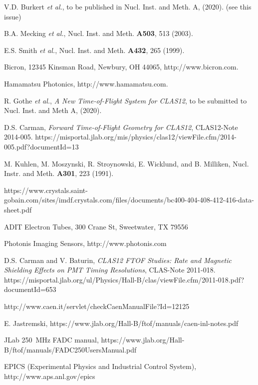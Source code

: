 \documentclass{elsart}
\begin{document}
\begin{thebibliography}{99}

V.D. Burkert {\it et al.}, to be published in Nucl. Inst. and Meth. A, (2020). (see this issue)
  
B.A. Mecking {\it et al.}, Nucl. Inst. and Meth. {\bf A503}, 513 (2003).

E.S. Smith {\it et al.}, Nucl. Inst. and Meth. {\bf A432}, 265 (1999).

Bicron, 12345 Kinsman Road, Newbury, OH 44065, http://www.bicron.com.

Hamamatsu Photonics, http://www.hamamatsu.com.
  
R. Gothe {\it et al.}, {\it A New Time-of-Flight System for CLAS12}, to be submitted to Nucl. Inst.
and Meth A, (2020).

D.S. Carman, {\it Forward Time-of-Flight Geometry for CLAS12}, CLAS12-Note 2014-005.
https://misportal.jlab.org/mis/physics/clas12/viewFile.cfm/2014-005.pdf?documentId=13

M. Kuhlen, M. Moszynski, R. Stroynowski, E. Wicklund, and B. Milliken, Nucl.  Instr. and Meth.
{\bf A301}, 223 (1991).

https://www.crystals.saint-gobain.com/sites/imdf.crystals.com/files/documents/bc400-404-408-412-416-data-sheet.pdf

ADIT Electron Tubes, 300 Crane St, Sweetwater, TX 79556
  
Photonis Imaging Sensors, http://www.photonis.com

D.S. Carman and V. Baturin, {\it CLAS12 FTOF Studies: Rate and Magnetic Shielding Effects on PMT Timing
Resolutions}, CLAS-Note 2011-018.\\
https://misportal.jlab.org/ul/Physics/Hall-B/clas/viewFile.cfm/2011-018.pdf?documentId=653
  
http://www.caen.it/servlet/checkCaenManualFile?Id=12125
  
E. Jastremski, https://www.jlab.org/Hall-B/ftof/manuals/caen-inl-notes.pdf

JLab 250~MHz FADC manual, https://www.jlab.org/Hall-B/ftof/manuals/FADC250UsersManual.pdf
  
EPICS (Experimental Physics and Industrial Control System),\\ http://www.aps.anl.gov/epics


\end{thebibliography}
\end{document}

